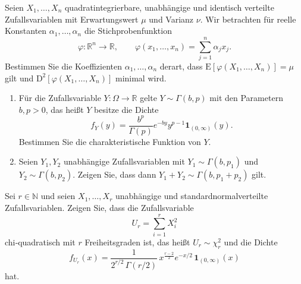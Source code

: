 \begin{aufgabe}
Seien \(X_1, \dots, X_n\) quadratintegrierbare, unabhängige und identisch verteilte Zufallsvariablen mit Erwartungswert \(\mu\) und Varianz \(\nu\). Wir betrachten für reelle Konstanten \(\alpha_1,\dots,\alpha_n\) die Stichprobenfunktion
\[
\varphi: \mathbb{R}^n \to \mathbb{R},\qquad
\varphi(x_1,\dots,x_n)=\sum_{j=1}^n \alpha_j x_j.
\]
Bestimmen Sie die Koeffizienten \(\alpha_1,\dots,\alpha_n\) derart, dass \(\mathrm{E}[\varphi(X_1,\dots,X_n)]=\mu\) gilt und \(\mathrm{D}^2[\varphi(X_1,\dots,X_n)]\) minimal wird.
\end{aufgabe}

\begin{aufgabe}
\begin{enumerate}
  \item Für die Zufallsvariable \(Y\colon \Omega\to\mathbb{R}\) gelte \(Y\sim \Gamma(b,p)\) mit den Parametern \(b,p>0\), das heißt \(Y\) besitze die Dichte
  \[
    f_Y(y)
    = \frac{b^p}{\Gamma(p)} e^{-b y} y^{p-1} \mathbf{1}_{(0,\infty)}(y).
  \]
  Bestimmen Sie die charakteristische Funktion von \(Y\).
  \item Seien \(Y_1,Y_2\) unabhängige Zufallsvariablen mit \(Y_1\sim \Gamma(b,p_1)\) und \(Y_2\sim \Gamma(b,p_2)\). Zeigen Sie, dass dann \(Y_1+Y_2\sim \Gamma(b,p_1+p_2)\) gilt.
\end{enumerate}
\end{aufgabe}

\begin{aufgabe}
Sei \(r\in\mathbb{N}\) und seien \(X_1,\dots,X_r\) unabhängige und standardnormalverteilte Zufallsvariablen. Zeigen Sie, dass die Zufallsvariable
\[
  U_r = \sum_{i=1}^r X_i^2
\]
chi‑quadratisch mit \(r\) Freiheitsgraden ist, das heißt \(U_r\sim \chi^2_r\) und die Dichte
\[
  f_{U_r}(x)
  = \frac{1}{2^{r/2}\,\Gamma(r/2)}\,x^{\frac{r-2}{2}}e^{-x/2}\,\mathbf{1}_{(0,\infty)}(x)
\]
hat.
\end{aufgabe}

